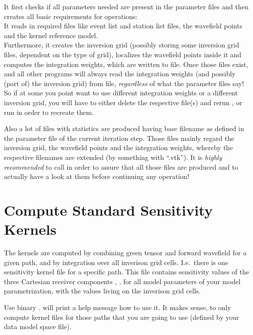 It first checks if all parameters needed are present in the parameter files and then creates all
basic requirements for \ASKI operations:\\
It reads in required files like event list and station list files, the wavefield points and the 
kernel reference model. \\
Furthermore, it creates the inversion grid (possibly storing some inversion grid files, dependent 
on the type of grid), localizes the wavefield points inside it and computes 
the integration weights, which are written to file. Once those files exist,  
and all other programs will always read the integration weights (and possibly (part of) the inversion grid) 
from file, \emph{regardless} of what the parameter files say! So if at some you point want to use 
different integration weights or a different inversion grid, you will have to either delete the respective 
file(s) and rerun , or run  in order
to recreate them. 

Also a lot of  files with statistics are produced having base filename  as 
defined in the parameter file of the current iteration step. Those files mainly regard the inversion grid, 
the wavefield points and the integration weights, whereby the respective filenames are extended (by something 
with ``.vtk''). It is \emph{highly recommended} to call  in order to assure that all
those  files are produced and to actually have a look at them before continuing any \ASKI operation!
%
\section{Compute Standard Sensitivity Kernels} \label{basic_steps,sec:compute_kernels}
%
The kernels are computed by combining green tensor and forward wavefield for a given path, and
by integration over all inverison grid cells. I.e.\ there is one sensitivity kernel file for a
specific path. This file contains sensitivity values of the three Cartesian receiver components 
, ,  for all model parameters of your model parametrization, with 
the values living on the inverison grid cells.

Use binary .  will print a help message how to use it.
It makes sense, to only compute kernel files for those paths that you are going to use (defined by
your data model space file).

